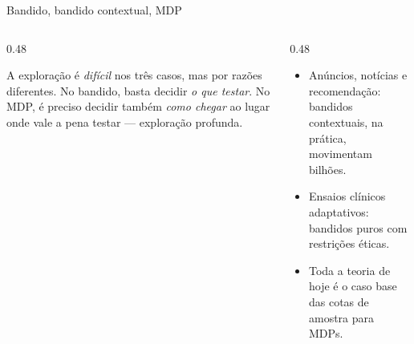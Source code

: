 \documentclass[aspectratio=169, 10pt]{beamer}
\begin{document}
\begin{frame}{Bandido, bandido contextual, MDP}
  \centering

  \vspace{1em}
  \begin{columns}[T]
    \begin{column}{0.48\textwidth}
      \begin{ideiabox}
        A exploração é \emph{difícil} nos três casos, mas por razões
        diferentes. No bandido, basta decidir \emph{o que testar}. No MDP,
        é preciso decidir também \emph{como chegar} ao lugar onde vale a
        pena testar --- exploração profunda.
      \end{ideiabox}
    \end{column}
    \begin{column}{0.48\textwidth}
      \begin{itemize}
        \item Anúncios, notícias e recomendação: bandidos contextuais, na
              prática, movimentam bilhões.
        \item Ensaios clínicos adaptativos: bandidos puros com
              restrições éticas.
        \item Toda a teoria de hoje é o caso base das cotas de amostra
              para MDPs.
      \end{itemize}
    \end{column}
  \end{columns}
\end{frame}
\end{document}
